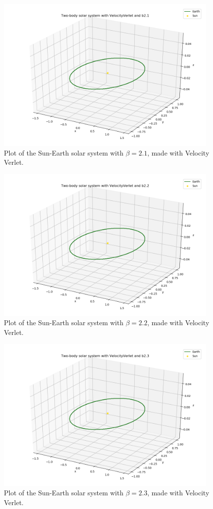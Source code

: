 \documentclass{article}
\begin{document}
    \begin{figure}[H]
        \centering
        \includegraphics[width = 11cm]{img/plot3D_S_E_V_b21.png}
        \caption{Plot of the Sun-Earth solar system with $\beta = 2.1$, made with Velocity Verlet.}
        \label{fig:plot3D_S_E_V_b21}
    \end{figure}

    \begin{figure}[H]
        \centering
        \includegraphics[width = 11cm]{img/plot3D_S_E_V_b22.png}
        \caption{Plot of the Sun-Earth solar system with $\beta = 2.2$, made with Velocity Verlet.}
        \label{fig:plot3D_S_E_V_b22}
    \end{figure}

    \begin{figure}[H]
        \centering
        \includegraphics[width = 11cm]{img/plot3D_S_E_V_b23.png}
        \caption{Plot of the Sun-Earth solar system with $\beta = 2.3$, made with Velocity Verlet.}
        \label{fig:plot3D_S_E_V_b23}
    \end{figure}
\end{document}
